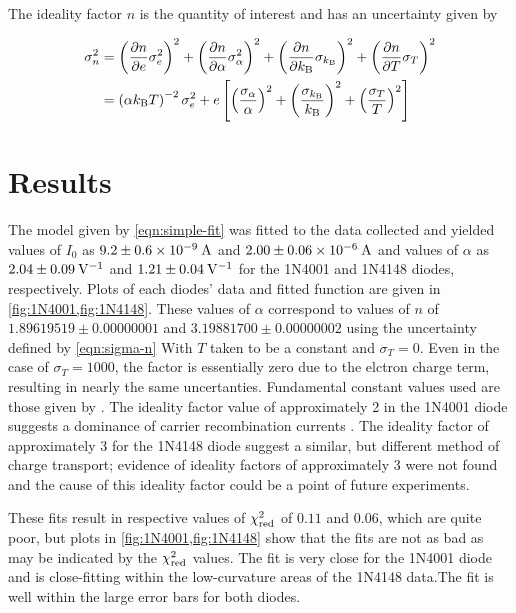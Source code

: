 \documentclass[reprint]{revtex4-1}
\begin{document}
The ideality factor $n$ is the quantity of interest and has an uncertainty given by 

\begin{equation} \label{eqn:sigma-n}
\begin{split}
\sigma_n^2 &= \left( \frac{\partial n}{\partial e} \sigma_e^2 \right)^2 + \left( \frac{\partial n}{\partial \alpha} \sigma_{\alpha}^2 \right)^2 + \left( \frac{\partial n}{\partial k_{\rm{B}}} \sigma_{k_{\rm{B}}} \right)^2 + \left( \frac{\partial n}{\partial T} \sigma_T \right)^2 \\
&= \left( \alpha k_{\rm{B}} T \right)^{-2} \sigma_e^2 + e \left[  \left( \frac{\sigma_{\alpha}}{\alpha} \right)^2 + \left( \frac{\sigma_{k_{\rm{B}}}}{k_{\rm{B}}} \right)^2 + \left( \frac{\sigma_T}{T} \right)^2  \right]
\end{split}
\end{equation}


\section{Results}

The model given by \cref{eqn:simple-fit} was fitted to the data collected and yielded values of $I_0$ as $9.2 \pm 0.6 \times 10^{-9}\:\rm{A}$ and $2.00 \pm 0.06 \times 10^{-6}\:\rm{A}$ and values of $\alpha$ as $2.04 \pm 0.09\:\rm{V}^{-1}$ and $1.21 \pm 0.04\:\rm{V}^{-1}$ for the \textsc{1N4001} and \textsc{1N4148} diodes, respectively. Plots of each diodes' data and fitted function are given in \cref{fig:1N4001,fig:1N4148}. These values of $\alpha$ correspond to values of $n$ of $1.89619519 \pm 0.00000001$ and $3.19881700 \pm 0.00000002$ using the uncertainty defined by \cref{eqn:sigma-n} With $T$ taken to be a constant and $\sigma_T = 0$. Even in the case of $\sigma_T = 1000$, the factor is essentially zero due to the elctron charge term, resulting in nearly the same uncertanties. Fundamental constant values used are those given by \cite{NIST2014}. The ideality factor value of approximately 2 in the \textsc{1N4001} diode suggests a dominance of carrier recombination currents \cite{Shockley1952}. The ideality factor of approximately 3 for the \textsc{1N4148} diode suggest a similar, but different method of charge transport; evidence of ideality factors of approximately 3 were not found and the cause of this ideality factor could be a point of future experiments.

These fits result in respective values of $\chi^2_{\rm{red}}$ of $0.11$ and $0.06$, which are quite poor, but plots in \cref{fig:1N4001,fig:1N4148} show that the fits are not as bad as may be indicated by the $\chi^2_{\rm{red}}$ values. The fit is very close for the \textsc{1N4001} diode and is close-fitting within the low-curvature areas of the \textsc{1N4148} data.The fit is well within the large error bars for both diodes.
\end{document}
